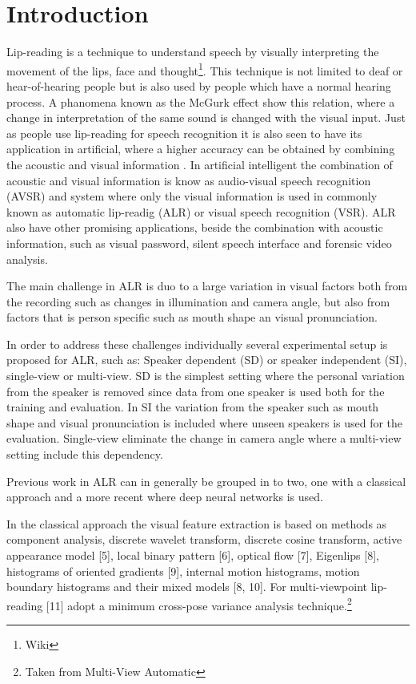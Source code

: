 \section{Introduction}
Lip-reading is a technique to understand speech by visually interpreting the movement of the lips, face and thought\footnote{Wiki}.
This technique is not limited to deaf or hear-of-hearing people but is also used by people which have a normal hearing process.
A phanomena known as the McGurk effect\cite{mcGurk} show this relation, where a change in interpretation of the same sound is changed with the visual input.
Just as people use lip-reading for speech recognition it is also seen to have its application in artificial, where a higher accuracy can be obtained by combining the acoustic and visual information \cite{Ngiam2011}.
In artificial intelligent the combination of acoustic and visual information is know as audio-visual speech recognition (AVSR) and system where only the visual information is used in commonly known as automatic lip-readig (ALR) or visual speech recognition (VSR).
ALR also have other promising applications, beside the combination with acoustic information, such as visual password, silent speech interface and forensic video analysis.

The main challenge in ALR is duo to a large variation in visual factors both from the recording such as changes in illumination and camera angle\cite{Potamianos2003}, but also from factors that is person specific such as mouth shape an visual pronunciation. 

In order to address these challenges individually several experimental setup is proposed for ALR, such as:
Speaker dependent (SD) or speaker independent (SI), single-view or multi-view.
SD is the simplest setting where the personal variation from the speaker is removed since data from one speaker is used both for the training and evaluation.
In SI the variation from the speaker such as mouth shape and visual pronunciation is included where unseen speakers is used for the evaluation.
Single-view eliminate the change in camera angle where a multi-view setting include this dependency.

Previous work in ALR can in generally be grouped in to two, one with a classical approach and a more recent where deep neural networks is used.

In the classical approach the visual feature extraction is based on methods as
component analysis, discrete wavelet transform, discrete cosine transform, active appearance model [5], local binary pattern [6], optical flow [7], Eigenlips [8], histograms of oriented gradients [9], internal motion histograms, motion boundary histograms and their mixed models [8, 10]. 
For multi-viewpoint lip-reading [11] adopt a minimum cross-pose variance analysis technique.\footnote{Taken from Multi-View Automatic}

